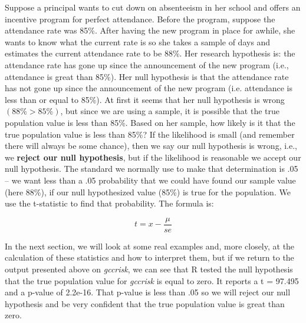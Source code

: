 \documentclass[11pt,openany]{book}\usepackage[]{graphicx}\usepackage[]{color}
\begin{document}
{Suppose a principal wants to cut down on absenteeism in her school and offers an incentive program for perfect attendance.  Before the program, suppose the attendance rate was 85\%.   After having the new program in place for awhile, she wants to know what the current rate is so she takes a sample of days and estimates the current attendance rate to be 88\%.   Her research hypothesis is: the attendance rate has gone up since the announcement of the new program (i.e., attendance is great than 85\%).  Her null hypothesis is that the attendance rate has not gone up since the announcement of the new program (i.e. attendance is less than or equal to 85\%).   At first it seems that her null hypothesis is wrong $(88\% > 85\%)$, but since we are using a sample, it is possible that the true population value is less than 85\%.  Based on her sample, how likely is it that the true population value is less than 85\%?  If the likelihood is small (and remember there will always be some chance), then we say our null hypothesis is wrong, i.e., we \textbf{reject our null hypothesis}, but if the likelihood is reasonable we accept our null hypothesis.   The standard we normally use to make that determination is .05 --  we want less than a .05 probability that we could have found our sample value (here 88\%), if our null hypothesized value (85\%) is true for the population.  We use the t-statistic to find that probability.  The formula is:

\begin{equation}
  \label{ch5_eq_label3}
  t = x - \frac{\mu}{se}
\end{equation}

In the next section, we will look at some real examples and, more closely, at the calculation of these statistics and how to interpret them, but if we return to the output presented above on \textit{gccrisk}, we can see that R tested the null hypothesis that the true population value for \textit{gccrisk} is equal to zero.  It reports a t = 97.495  and a p-value of 2.2e-16.  That p-value is less than .05 so we will reject our null hypothesis and be very confident that the true population value is great than zero.

}
\end{document}

